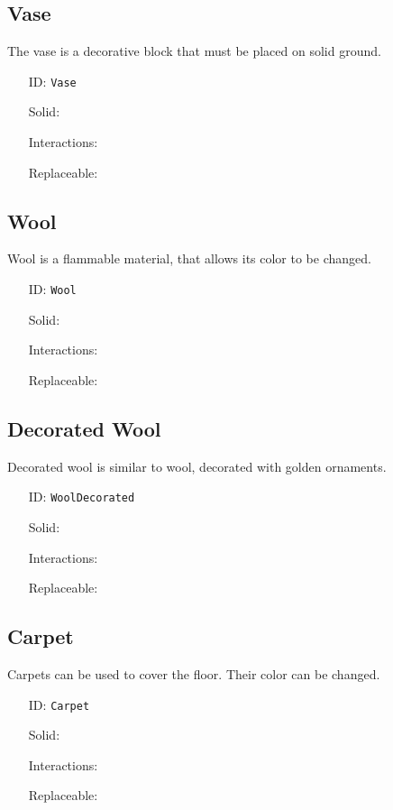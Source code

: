 \subsection{Vase}\label{subsec:blocks_vase}
The vase is a decorative block that must be placed on solid ground.
\newline
\begin{itemize}[nosep]
\item[ID:] \texttt{Vase}
\item[Solid:]  \Checkmark \item[Interactions:]  \XSolidBrush \item[Replaceable:]  \XSolidBrush \end{itemize}

\subsection{Wool}\label{subsec:blocks_wool}
Wool is a flammable material, that allows its color to be changed.
\newline
\begin{itemize}[nosep]
\item[ID:] \texttt{Wool}
\item[Solid:]  \Checkmark \item[Interactions:]  \Checkmark \item[Replaceable:]  \XSolidBrush \end{itemize}

\subsection{Decorated Wool}\label{subsec:blocks_decorated wool}
Decorated wool is similar to wool, decorated with golden ornaments.
\newline
\begin{itemize}[nosep]
\item[ID:] \texttt{WoolDecorated}
\item[Solid:]  \Checkmark \item[Interactions:]  \Checkmark \item[Replaceable:]  \XSolidBrush \end{itemize}

\subsection{Carpet}\label{subsec:blocks_carpet}
Carpets can be used to cover the floor. Their color can be changed.
\newline
\begin{itemize}[nosep]
\item[ID:] \texttt{Carpet}
\item[Solid:]  \Checkmark \item[Interactions:]  \Checkmark \item[Replaceable:]  \XSolidBrush \end{itemize}

